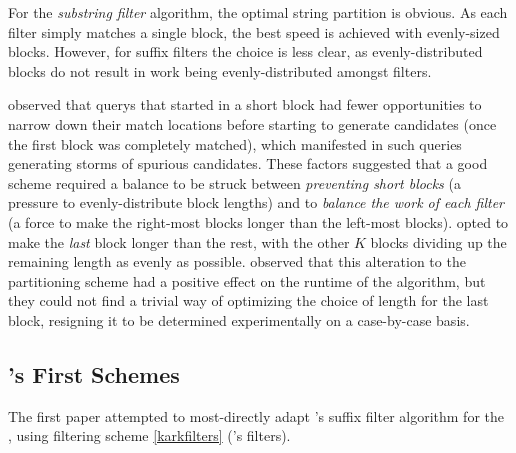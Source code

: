 {For the \textit{substring filter} algorithm, the optimal string partition is obvious. As each \gls{filter} simply matches a single \gls{block}, the best speed is achieved with evenly-sized blocks. However, for \glspl{suffix filter} the choice is less clear, as evenly-distributed blocks do not result in work being evenly-distributed amongst filters.

\kark{} observed that \glspl{query} that started in a short block had fewer opportunities to narrow down their \glspl{match location} before starting to generate \glspl{candidate} (once the first block was completely matched), which manifested in such queries generating storms of spurious candidates. These factors suggested that a good scheme required a balance to be struck between \textit{preventing short blocks} (a pressure to evenly-distribute block lengths) and to \textit{balance the work of each filter} (a force to make the right-most blocks longer than the left-most blocks). \kark{} opted to make the \textit{last} block longer than the rest, with the other $K$ blocks dividing up the remaining length as evenly as possible. \kark{} observed that this alteration to the partitioning scheme had a positive effect on the runtime of the algorithm, but they could not find a trivial way of optimizing the choice of length for the last block, resigning it to be determined experimentally on a case-by-case basis.


\subsection{\vali{}'s First Schemes}
\label{schemes:vali1}

The first \vali{} paper attempted to most-directly adapt \kark{}'s \gls{suffix filter} algorithm for the \aspop{}, using filtering scheme \ref{karkfilters} (\kark{}'s filters).

}
